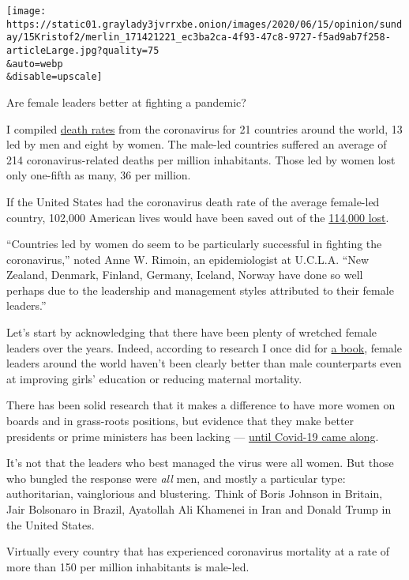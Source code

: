 \texttt{[image: https://static01.graylady3jvrrxbe.onion/images/2020/06/15/opinion/sunday/15Kristof2/merlin\_171421221\_ec3ba2ca-4f93-47c8-9727-f5ad9ab7f258-articleLarge.jpg?quality=75\\\&auto=webp\\\&disable=upscale]}

Are female leaders better at fighting a pandemic?

I compiled
\href{https://ourworldindata.org/grapher/total-covid-deaths-per-million}{death
rates} from the coronavirus for 21 countries around the world, 13 led by
men and eight by women. The male-led countries suffered an average of
214 coronavirus-related deaths per million inhabitants. Those led by
women lost only one-fifth as many, 36 per million.

If the United States had the coronavirus death rate of the average
female-led country, 102,000 American lives would have been saved out of
the
\href{https://www.nytimes3xbfgragh.onion/interactive/2020/us/coronavirus-us-cases.html}{114,000
lost}.

``Countries led by women do seem to be particularly successful in
fighting the coronavirus,'' noted Anne W. Rimoin, an epidemiologist at
U.C.L.A. ``New Zealand, Denmark, Finland, Germany, Iceland, Norway have
done so well perhaps due to the leadership and management styles
attributed to their female leaders.''

Let's start by acknowledging that there have been plenty of wretched
female leaders over the years. Indeed, according to research I once did
for
\href{https://www.penguinrandomhouse.com/books/95840/half-the-sky-by-nicholas-d-kristof-and-sheryl-wudunn/}{a
book}, female leaders around the world haven't been clearly better than
male counterparts even at improving girls' education or reducing
maternal mortality.

There has been solid research that it makes a difference to have more
women on boards and in grass-roots positions, but evidence that they
make better presidents or prime ministers has been lacking ---
\href{https://www.nytimes3xbfgragh.onion/2020/05/15/world/coronavirus-women-leaders.html}{until
Covid-19 came along}.

It's not that the leaders who best managed the virus were all women. But
those who bungled the response were \emph{all} men, and mostly a
particular type: authoritarian, vainglorious and blustering. Think of
Boris Johnson in Britain, Jair Bolsonaro in Brazil, Ayatollah Ali
Khamenei in Iran and Donald Trump in the United States.

Virtually every country that has experienced coronavirus mortality at a
rate of more than 150 per million inhabitants is male-led.


